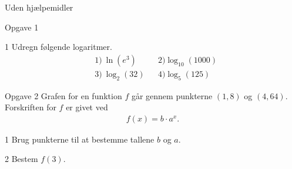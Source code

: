 \begin{center}
	\LARGE Uden hjælpemidler
\end{center}
\begin{opgavetekst}{Opgave 1}
\end{opgavetekst}
\begin{delopgave}{}{1}
	Udregn følgende logaritmer.
	\begin{align*}
		&1) \ \ln(e^3) &   &2) \log_{10}(1000)\\
		&3) \ \log_2(32) &   & 4) \log_5(125) 
	\end{align*}
\end{delopgave}
\begin{opgavetekst}{Opgave 2}
	Grafen for en funktion $f$ går gennem punkterne $(1,8)$ og $(4,64)$. Forskriften for $f$ er givet ved
	\begin{align*}
		f(x) = b\cdot a^x.
	\end{align*}
\end{opgavetekst}
\begin{delopgave}{}{1}
	Brug punkterne til at bestemme tallene $b$ og $a$.
\end{delopgave}
\begin{delopgave}{}{2}
	Bestem $f(3)$.
\end{delopgave}
